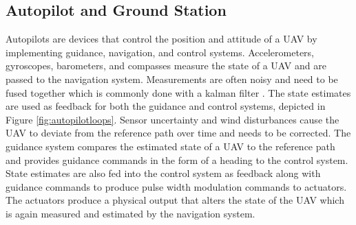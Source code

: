 \documentclass[numbered,pdftex]{ohio-etd}
\begin{document}

\subsection{Autopilot and Ground Station}

Autopilots are devices that control the position and attitude of a UAV by implementing guidance, navigation, and control systems. Accelerometers, gyroscopes, barometers, and compasses measure the state of a UAV and are passed to the navigation system. Measurements are often noisy and need to be fused together which is commonly done with a kalman filter \cite{beard_small_2012}. The state estimates are used as feedback for both the guidance and control systems, depicted in Figure \ref{fig:autopilotloops}. Sensor uncertainty and wind disturbances cause the UAV to deviate from the reference path over time and needs to be corrected. The guidance system compares the estimated state of a UAV to the reference path and provides guidance commands in the form of a heading to the control system. State estimates are also fed into the control system as feedback along with guidance commands to produce pulse width modulation commands to actuators. The actuators produce a physical output that alters the state of the UAV which is again measured and estimated by the navigation system. 
\end{document}
